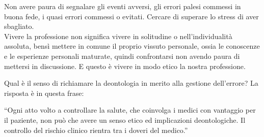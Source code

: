 Non avere paura di segnalare gli eventi avversi, gli errori palesi
commessi in buona fede, i quasi errori commessi o evitati. Cercare di
superare lo stress di aver sbagliato.\\
Vivere la professione non significa vivere in solitudine o
nell'individualità assoluta, bensì mettere in comune il proprio vissuto
personale, ossia le conoscenze e le esperienze personali maturate,
quindi confrontarsi non avendo paura di mettersi in discussione. E
questo è vivere in modo etico la nostra professione.

Qual è il senso di richiamare la deontologia in merito alla gestione
dell'errore? La risposta è in questa frase:

``Ogni atto volto a controllare la salute, che coinvolga i medici con
vantaggio per il paziente, non può che avere un senso etico ed
implicazioni deontologiche. Il controllo del rischio clinico rientra tra
i doveri del medico.''